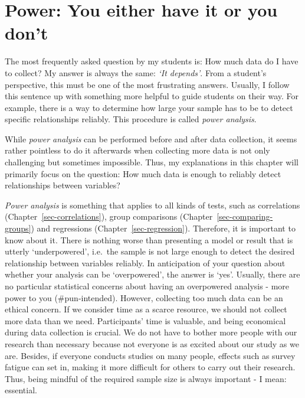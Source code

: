 \documentclass[
  letterpaper,
]{krantz}
\begin{document}

\chapter{Power: You either have it or you
don't}\label{sec-power-analysis}

The most frequently asked question by my students is: How much data do I
have to collect? My answer is always the same: \emph{`It depends'}. From
a student's perspective, this must be one of the most frustrating
answers. Usually, I follow this sentence up with something more helpful
to guide students on their way. For example, there is a way to determine
how large your sample has to be to detect specific relationships
reliably. This procedure is called \emph{power analysis}.

While \emph{power analysis} can be performed before and after data
collection, it seems rather pointless to do it afterwards when
collecting more data is not only challenging but sometimes impossible.
Thus, my explanations in this chapter will primarily focus on the
question: How much data is enough to reliably detect relationships
between variables?

\emph{Power analysis} is something that applies to all kinds of tests,
such as correlations (Chapter~\ref{sec-correlations}), group comparisons
(Chapter~\ref{sec-comparing-groups}) and regressions
(Chapter~\ref{sec-regression}). Therefore, it is important to know about
it. There is nothing worse than presenting a model or result that is
utterly `underpowered', i.e.~the sample is not large enough to detect
the desired relationship between variables reliably. In anticipation of
your question about whether your analysis can be `overpowered', the
answer is `yes'. Usually, there are no particular statistical concerns
about having an overpowered analysis - more power to you
(\#pun-intended). However, collecting too much data can be an ethical
concern. If we consider time as a scarce resource, we should not collect
more data than we need. Participants' time is valuable, and being
economical during data collection is crucial. We do not have to bother
more people with our research than necessary because not everyone is as
excited about our study as we are. Besides, if everyone conducts studies
on many people, effects such as survey fatigue can set in, making it
more difficult for others to carry out their research. Thus, being
mindful of the required sample size is always important - I mean:
essential.
\end{document}
